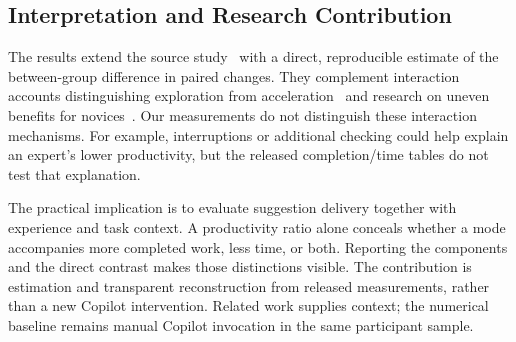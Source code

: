 \subsection{Interpretation and Research Contribution}
The results extend the source study~\cite{guglielmi2026copilot} with a direct,
reproducible estimate of the between-group difference in paired changes.
They complement interaction accounts distinguishing exploration from
acceleration~\cite{barke2023grounded} and research on uneven benefits for
novices~\cite{prather2024widening}. Our measurements do not distinguish these
interaction mechanisms. For example, interruptions or additional checking
could help explain an expert's lower productivity, but the released
completion/time tables do not test that explanation.

The practical implication is to evaluate suggestion delivery together with
experience and task context. A productivity ratio alone conceals whether a
mode accompanies more completed work, less time, or both. Reporting the
components and the direct contrast makes those distinctions visible.
The contribution is estimation and transparent reconstruction from released
measurements, rather than a new Copilot intervention. Related work supplies
context; the numerical baseline remains manual Copilot invocation in the
same participant sample.
